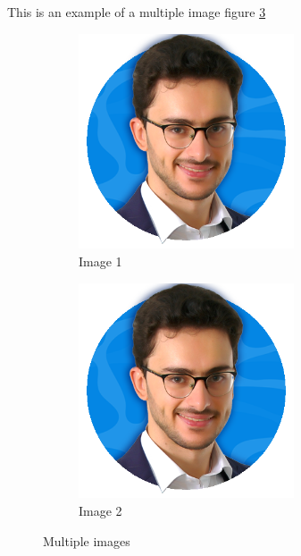         This is an example of a multiple image figure \ref{img:multiple}
        
        \begin{figure}[htbp]
        \begin{subfigure}[t]{0.5\linewidth}
        \centering
        \includegraphics[width=0.7\textwidth]{images/example.png}
        \caption{Image 1}
        \label{subfig:img1}
        \end{subfigure}%
        \begin{subfigure}[t]{0.5\linewidth}
        \centering
        \includegraphics[width=0.7\textwidth]{images/example.png}
        \caption{Image 2}
        \label{subfig:img2}
        \end{subfigure}
        \caption{Multiple images}
        \label{img:multiple}
        \end{figure}
        
